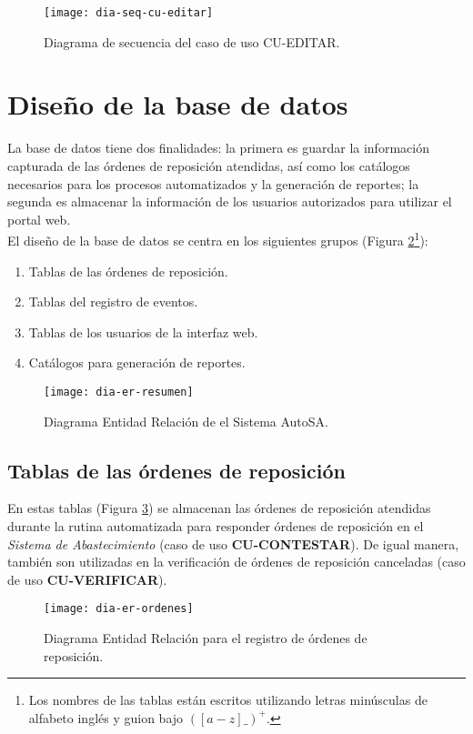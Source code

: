 \begin{figure}[h]
	\centering
	\texttt{[image: dia-seq-cu-editar]}
	\caption{Diagrama de secuencia del caso de uso CU-EDITAR.}
	\label{fig:dia-seq-cu-editar}
\end{figure}



\section{Diseño de la base de datos}
La base de datos tiene dos finalidades: la primera es guardar la información capturada de las órdenes de reposición atendidas, así como los catálogos necesarios para los procesos automatizados y la generación de reportes; la segunda es almacenar la información de los usuarios autorizados para utilizar el portal web.\\
El diseño de la base de datos se centra en los siguientes grupos (Figura \ref{fig:dia-er-resumen}\footnote{Los nombres de las tablas están escritos utilizando letras minúsculas de alfabeto inglés y guion bajo $([a-z]{\_})^+$.}):
\begin{enumerate}
	\item Tablas de las órdenes de reposición.
	\item Tablas del registro de eventos.
	\item Tablas de los usuarios de la interfaz web.
	\item Catálogos para generación de reportes.
\end{enumerate}
\begin{figure}[h]
  \centering
  \texttt{[image: dia-er-resumen]}
  \caption{Diagrama Entidad Relación de el Sistema AutoSA.}
  \label{fig:dia-er-resumen}
\end{figure}


\subsection{Tablas de las órdenes de reposición}
En estas tablas (Figura \ref{fig:dia-er-ordenes}) se almacenan las órdenes de reposición atendidas durante la rutina automatizada para responder órdenes de reposición en el \textit{Sistema de Abastecimiento} (caso de uso \textbf{CU-CONTESTAR}). De igual manera, también son utilizadas en la verificación de órdenes de reposición canceladas (caso de uso \textbf{CU-VERIFICAR}).
\begin{figure}[h]
  \centering
  \texttt{[image: dia-er-ordenes]} 
  \caption{Diagrama Entidad Relación para el registro de órdenes de reposición.}
  \label{fig:dia-er-ordenes}
\end{figure}
